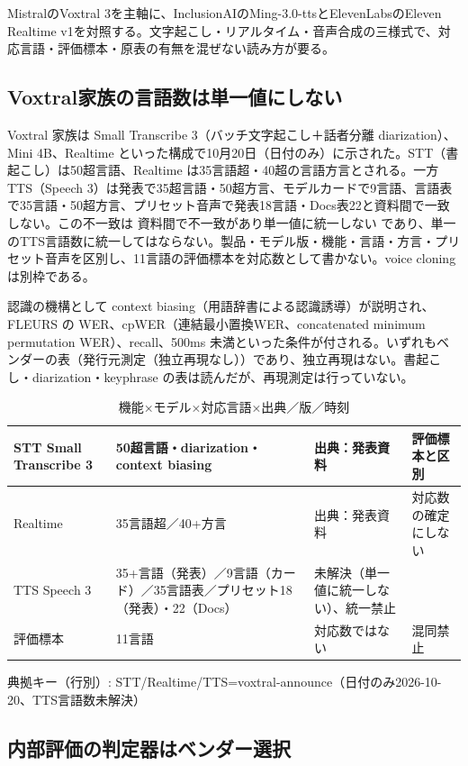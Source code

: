 \documentclass[lualatex,a4paper,10pt]{jlreq}
\begin{document}
MistralのVoxtral 3を主軸に、InclusionAIのMing-3.0-ttsとElevenLabsのEleven Realtime v1を対照する。文字起こし・リアルタイム・音声合成の三様式で、対応言語・評価標本・原表の有無を混ぜない読み方が要る。


\subsection*{Voxtral家族の言語数は単一値にしない}


Voxtral 家族は Small Transcribe 3（バッチ文字起こし＋話者分離 diarization）、Mini 4B、Realtime といった構成で10月20日（日付のみ）に示された。STT（書起こし）は50超言語、Realtime は35言語超・40超の言語方言とされる。一方 TTS（Speech 3）は発表で35超言語・50超方言、モデルカードで9言語、言語表で35言語・50超方言、プリセット音声で発表18言語・Docs表22と資料間で一致しない。この不一致は 資料間で不一致があり単一値に統一しない であり、単一のTTS言語数に統一してはならない。製品・モデル版・機能・言語・方言・プリセット音声を区別し、11言語の評価標本を対応数として書かない。voice cloning は別枠である。


認識の機構として context biasing（用語辞書による認識誘導）が説明され、FLEURS の WER、cpWER（連結最小置換WER、concatenated minimum permutation WER）、recall、500ms 未満といった条件が付される。いずれもベンダーの表（発行元測定（独立再現なし））であり、独立再現はない。書起こし・diarization・keyphrase の表は読んだが、再現測定は行っていない。


\begin{table}[htbp]\centering\footnotesize
\caption{機能×モデル×対応言語×出典／版／時刻}
\begin{tabularx}{0.96\linewidth}{@{}lXXX@{}}
\toprule
STT Small Transcribe 3 & 50超言語・diarization・context biasing & 出典：発表資料 & 評価標本と区別 \\
\midrule
Realtime & 35言語超／40+方言 & 出典：発表資料 & 対応数の確定にしない \\
TTS Speech 3 & 35+言語（発表）／9言語（カード）／35言語表／プリセット18（発表）・22（Docs） & 未解決（単一値に統一しない）、統一禁止 &  \\
評価標本 & 11言語 & 対応数ではない & 混同禁止 \\
\bottomrule
\end{tabularx}
{\scriptsize\color{SurveyMuted} 典拠キー（行別）: STT/Realtime/TTS=voxtral-announce（日付のみ2026-10-20、TTS言語数未解決）\par}
\end{table}


\subsection*{内部評価の判定器はベンダー選択}
\end{document}
